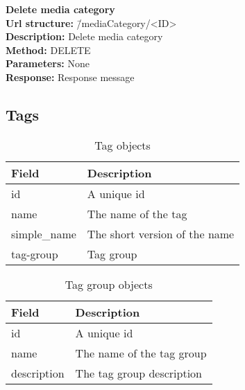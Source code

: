 \documentclass[11pt]{article}
\begin{document}
\begin{tabbing}
\textbf{Delete media category} \\
\textcolor{black!60}{\textbf{Url structure:}} \hspace{0.2in} \= /mediaCategory/<ID> \\
\textcolor{black!60}{\textbf{Description:}}  \> Delete media category \\
\textcolor{black!60}{\textbf{Method:}} \> DELETE \\
\textcolor{black!60}{\textbf{Parameters:}} \> None \\
\textcolor{black!60}{\textbf{Response:}} \> Response message
\end{tabbing}


\subsection{Tags}
\label{sec-1-4}

\begin{table}[H]
\caption{Tag objects}
\begin{center}
\begin{tabular}{|l|l|}
\hline
 Field                     &  Description                    \\
\hline
 id                        &  A unique id                    \\
 name                      &  The name of the tag            \\
 simple\_name  &  The short version of the name  \\
 tag-group                 &  Tag group                      \\
\hline
\end{tabular}
\end{center}
\end{table}

\begin{table}[H]
\caption{Tag group objects}
\begin{center}
\begin{tabular}{|l|l|}
\hline
 Field        &  Description                \\
\hline
 id           &  A unique id                \\
 name         &  The name of the tag group  \\
 description  &  The tag group description  \\
\hline
\end{tabular}
\end{center}
\end{table}
\end{document}
